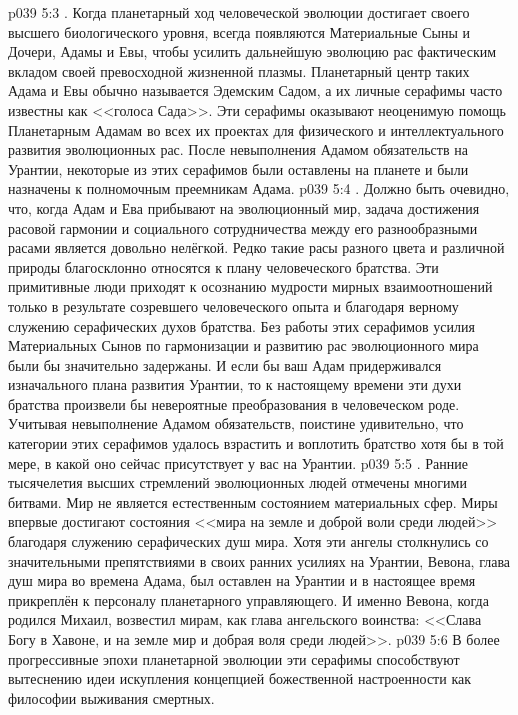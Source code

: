 \vs p039 5:3 . Когда планетарный ход человеческой эволюции достигает своего высшего биологического уровня, всегда появляются Материальные Сыны и Дочери, Адамы и Евы, чтобы усилить дальнейшую эволюцию рас фактическим вкладом своей превосходной жизненной плазмы. Планетарный центр таких Адама и Евы обычно называется Эдемским Садом, а их личные серафимы часто известны как <<голоса Сада>>. Эти серафимы оказывают неоценимую помощь Планетарным Адамам во всех их проектах для физического и интеллектуального развития эволюционных рас. После невыполнения Адамом обязательств на Урантии, некоторые из этих серафимов были оставлены на планете и были назначены к полномочным преемникам Адама.
\vs p039 5:4 . Должно быть очевидно, что, когда Адам и Ева прибывают на эволюционный мир, задача достижения расовой гармонии и социального сотрудничества между его разнообразными расами является довольно нелёгкой. Редко такие расы разного цвета и различной природы благосклонно относятся к плану человеческого братства. Эти примитивные люди приходят к осознанию мудрости мирных взаимоотношений только в результате созревшего человеческого опыта и благодаря верному служению серафических духов братства. Без работы этих серафимов усилия Материальных Сынов по гармонизации и развитию рас эволюционного мира были бы значительно задержаны. И если бы ваш Адам придерживался изначального плана развития Урантии, то к настоящему времени эти духи братства произвели бы невероятные преобразования в человеческом роде. Учитывая невыполнение Адамом обязательств, поистине удивительно, что категории этих серафимов удалось взрастить и воплотить братство хотя бы в той мере, в какой оно сейчас присутствует у вас на Урантии.
\vs p039 5:5 . Ранние тысячелетия высших стремлений эволюционных людей отмечены многими битвами. Мир не является естественным состоянием материальных сфер. Миры впервые достигают состояния <<мира на земле и доброй воли среди людей>> благодаря служению серафических душ мира. Хотя эти ангелы столкнулись со значительными препятствиями в своих ранних усилиях на Урантии, Вевона, глава душ мира во времена Адама, был оставлен на Урантии и в настоящее время прикреплён к персоналу планетарного управляющего. И именно Вевона, когда родился Михаил, возвестил мирам, как глава ангельского воинства: <<Слава Богу в Хавоне, и на земле мир и добрая воля среди людей>>.
\vs p039 5:6 В более прогрессивные эпохи планетарной эволюции эти серафимы способствуют вытеснению идеи искупления концепцией божественной настроенности как философии выживания смертных.
